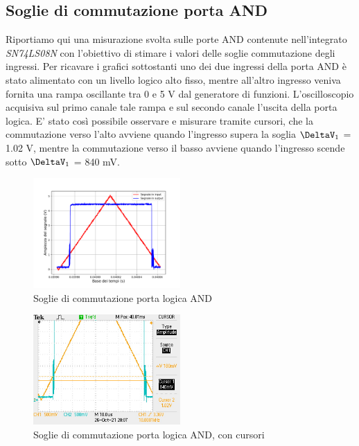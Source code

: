 \documentclass[journal]{IEEEtran}
\begin{document}

\clearpage

\begin{appendices}

\section{Soglie di commutazione porta AND}

Riportiamo qui una misurazione svolta sulle porte AND contenute nell'integrato \textit{SN74LS08N} con l'obiettivo di stimare i valori delle soglie commutazione degli ingressi. Per ricavare i grafici sottostanti uno dei due ingressi della porta AND è stato alimentato con un livello logico alto fisso, mentre all'altro ingresso veniva fornita una rampa oscillante tra 0 e 5 V dal generatore di funzioni. L'oscilloscopio acquisiva sul primo canale tale rampa e sul secondo canale l'uscita della porta logica. E' stato così possibile osservare e misurare tramite cursori, che la commutazione verso l'alto avviene quando l'ingresso supera la soglia $\DeltaV_1$ = 1.02 V, mentre la commutazione verso il basso avviene quando l'ingresso scende sotto $\DeltaV_1$ = 840 mV. 

\begin{figure}[H]%
\begin{center}
\includegraphics[width=0.50\textwidth]{analysis/output/and-switching.pdf}
\caption{Soglie di commutazione porta logica AND}
\label{fig:AND-switching}
\end{center}
\end{figure}



\begin{figure}[H]%
\begin{center}
\includegraphics[width=0.50\textwidth]{data-source/26-10-21/ALL0003/F0003TEK.JPG}
\caption{Soglie di commutazione porta logica AND, con cursori}
\label{fig:AND-switching}
\end{center}
\end{figure}


\end{appendices}
\end{document}
